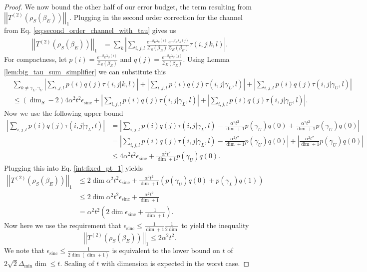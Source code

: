 \documentclass{article}
\newcommand{\parens}[1]{\left( #1 \right)}
\newcommand{\abs}[1]{\left| #1 \right|}
\newcommand{\norm}[1]{\left| \left| #1 \right| \right|}
\newcommand{\partfun}{\mathcal{Z}}
\DeclareMathOperator{\sinc}{sinc}
\begin{document}
\begin{proof}
    We now bound the other half of our error budget, the term resulting from $\norm{T^{(2)}(\rho_S(\beta_E))}_1$. Plugging in the second order correction for the channel from Eq. \eqref{eq:second_order_channel_with_tau} gives us
    \begin{align}
        \norm{T^{(2)}(\rho_S(\beta_E))}_1 &= \sum_k \abs{\sum_{i,j,l} \frac{e^{-\beta_E \lambda_S(i)}}{\partfun_S(\beta_E)} \frac{e^{-\beta_E \lambda_S(j)}}{\partfun_E(\beta_E)} \tau(i,j|k,l)}.
    \end{align}
    For compactness, let $p(i) = \frac{e^{-\beta_E \lambda_S(i)}}{\partfun_S(\beta_E)}$ and $q(j) =\frac{e^{-\beta_E \lambda_S(j)}}{\partfun_E(\beta_E)}$. Using Lemma \ref{lem:big_tau_sum_simplifier} we can substitute this 
    \begin{align}
        &\sum_{k \neq \gamma_L, \gamma_U} \abs{\sum_{i,j,l} p(i) q(j) \tau(i,j|k,l) } + \abs{\sum_{i,j,l} p(i)q(j) \tau(i,j | \gamma_L, l)} + \abs{\sum_{i,j,l} p(i) q(j) \tau(i,j| \gamma_U, l)} \\
        &\leq (\dim_S - 2) 4 \alpha^2 t^2 \epsilon_{\sinc} + \abs{\sum_{i,j,l} p(i)q(j) \tau(i,j | \gamma_L, l)} + \abs{\sum_{i,j,l} p(i) q(j) \tau(i,j| \gamma_U, l)}. \label{int:fixed_pt_1}
    \end{align}
    Now we use the following upper bound
    \begin{align}
        \abs{\sum_{i,j,l} p(i) q(j) \tau(i,j|\gamma_L ,l)} &= \abs{\sum_{i,j,l} p(i) q(j) \tau(i,j|\gamma_L ,l) - \frac{\alpha^2 t^2}{\dim + 1} p(\gamma_U) q(0) + \frac{\alpha^2 t^2}{\dim + 1} p(\gamma_U) q(0)} \\
        &= \abs{\sum_{i,j,l} p(i) q(j) \tau(i,j|\gamma_L ,l) - \frac{\alpha^2 t^2}{\dim + 1} p(\gamma_U) q(0)} + \abs{\frac{\alpha^2 t^2}{\dim + 1} p(\gamma_U) q(0)} \\
        &\leq 4 \alpha^2 t^2 \epsilon_{\sinc} + \frac{\alpha^2 t^2}{\dim + 1} p(\gamma_U) q(0).
    \end{align}
    Plugging this into Eq. \eqref{int:fixed_pt_1} yields
    \begin{align}
        \norm{T^{(2)} (\rho_S(\beta_E))}_1 &\leq 2 \dim \alpha^2 t^2 \epsilon_{\sinc} + \frac{\alpha^2 t^2}{\dim + 1}(p(\gamma_U) q(0) + p(\gamma_L) q(1)) \\
        &\leq 2 \dim \alpha^2 t^2 \epsilon_{\sinc} + \frac{\alpha^2 t^2}{\dim + 1} \\
        &= \alpha^2 t^2 \parens{2 \dim \epsilon_{\sinc} + \frac{1}{\dim + 1}}.
    \end{align}
    Now here we use the requirement that $\epsilon_{\sinc} \leq \frac{1}{\dim + 1} \frac{1}{2 \dim}$ to yield the inequality
    \begin{equation}
        \norm{T^{(2)}(\rho_S(\beta_E))}_1 \leq 2 \alpha^2 t^2. \label{eq:upper_bound_on_T_2}
    \end{equation}
    We note that $\epsilon_{\sinc} \leq \frac{1}{2 \dim (\dim + 1)}$ is equivalent to the lower bound on $t$ of $2 \sqrt{2} \Delta_{\min} \dim \leq t$. Scaling of $t$ with dimension is expected in the worst case. 


\end{proof}
\end{document}
